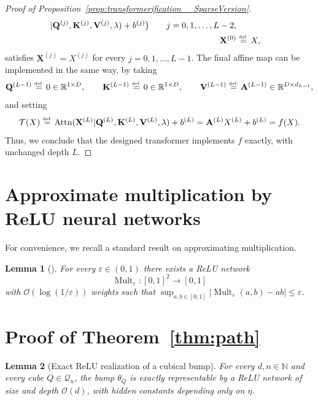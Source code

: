 \documentclass{article}
\newtheorem{lemma}{Lemma}[section]
\newcommand{\eqdef }{\ensuremath{\stackrel{\mbox{\upshape\tiny def.}}{=}}}
\begin{document}
\begin{proof}[{Proof of Proposition~\ref{prop:transformerification__SparseVersion}}]
\begin{align*}
            |{\bf Q}^{(j)},{\bf K}^{(j)},{\bf V}^{(j)},\lambda
        )
        +
        b^{(j)}
    \big) 
    \qquad j=0,1,\dots,L-2,
    \\
    \mathbf{X}^{(0)}
    &\eqdef  X,
\end{align*}
satisfies
$
\mathbf{X}^{(j)}=X^{(j)}
$
for every $j=0,1,\dots,L-1$.  
The final affine map can be implemented in the same way, by taking
\[
    {\bf Q}^{(L-1)}\eqdef  0\in\mathbb{R}^{1\times D},
    \qquad
    {\bf K}^{(L-1)}\eqdef  0\in\mathbb{R}^{1\times D},
    \qquad
    {\bf V}^{(L-1)}\eqdef  {\bf A}^{(L-1)}\in\mathbb{R}^{D\times d_{L-1}},
\]
and setting
\[
    \mathcal{T}(X)
    \eqdef 
    \operatorname{Attn}(
        \mathbf{X}^{(L)}
        |{\bf Q}^{(L)},{\bf K}^{(L)},{\bf V}^{(L)},\lambda
    )
    +
    b^{(L)}
    =
    {\bf A}^{(L)}X^{(L)}+b^{(L)}
    =
    f(X).
\]
Thus, we conclude that the designed transformer implements $f$ exactly, with unchanged depth $L$.
\end{proof}

\section{Approximate multiplication by ReLU neural networks}

For convenience, we recall a standard result on approximating multiplication.


\begin{lemma}[{\cite[Proposition 3]{yarotsky2017}}]
\label{lem:approx-mult}
For every \(\varepsilon\in(0,1)\) there exists a ReLU network
\[
\operatorname{Mult}_{\varepsilon}:[0,1]^2\to[0,1]
\]
with \(\mathcal{O}(\log(1/\varepsilon))\) weights such that
$
\sup_{a,b\in[0,1]}
\left|
\operatorname{Mult}_{\varepsilon}(a,b)-ab
\right|
\leq \varepsilon 
$.
\end{lemma}


\section{Proof of Theorem~\ref{thm:path}}
\label{appx:cubicalpath}



\begin{lemma}[Exact ReLU realization of a cubical bump]
\label{lem:cubical-bump}
For every $d,n\in\mathbb N$ and every cube $Q\in\mathcal Q_n$, the bump $\theta_Q$ is exactly
representable by a ReLU network of size and depth $\mathcal O(d)$, with hidden constants depending only
on $\eta$.
\end{lemma}
\end{document}
